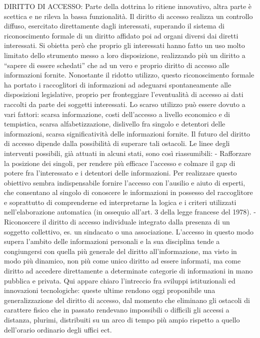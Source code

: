 DIRITTO DI ACCESSO:
Parte della dottrina lo ritiene innovativo, altra parte è scettica e ne rileva la bassa funzionalità.
Il diritto di accesso realizza un controllo diffuso, esercitato direttamente dagli interessati, superando il sistema di riconoscimento formale di un diritto affidato poi ad organi diversi dai diretti interessati. Si obietta però che proprio gli interessati hanno fatto un uso molto limitato dello strumento messo a loro disposizione, realizzando più un diritto a “sapere di essere schedati” che ad un vero e proprio diritto di accesso alle informazioni fornite. Nonostante il ridotto utilizzo, questo riconoscimento formale ha portato i raccoglitori di informazioni ad adeguarsi spontaneamente alle disposizioni legislative, proprio per fronteggiare l’eventualità di accesso ai dati raccolti da parte dei soggetti interessati. Lo scarso utilizzo può essere dovuto a vari fattori: scarsa informazione, costi dell’accesso a livello economico e di tempistica, scarsa alfabetizzazione, dislivello fra singolo e detentori delle informazioni, scarsa significatività delle informazioni fornite. Il futuro del diritto di accesso dipende dalla possibilità di superare tali ostacoli. Le linee degli interventi possibili, già attuati in alcuni stati, sono così riassumibili:
-	Rafforzare la posizione dei singoli, per rendere più efficace l’accesso e colmare il gap di potere fra l’interessato e i detentori delle informazioni. Per realizzare questo obiettivo sembra indispensabile fornire l’accesso con l’ausilio e aiuto di esperti, che consentano al singolo di conoscere le informazioni in possesso del raccoglitore e soprattutto di comprenderne ed interpretarne la logica e i criteri utilizzati nell’elaborazione automatica (in ossequio all’art. 3 della legge francese del 1978).
-	Riconoscere il diritto di accesso individuale integrato dalla presenza di un soggetto collettivo, es. un sindacato o una associazione. 
L’accesso in questo modo supera l’ambito delle informazioni personali e la sua disciplina tende a congiungersi con quella più generale del diritto all’informazione, ma visto in modo più dinamico, non più come unico diritto ad essere informati, ma come diritto ad accedere direttamente a determinate categorie di informazioni in mano pubblica e privata. Qui appare chiaro l’intreccio fra sviluppi istituzionali ed innovazioni tecnologiche: queste ultime rendono oggi proponibile una generalizzazione del diritto di accesso, dal momento che eliminano gli ostacoli di carattere fisico che in passato rendevano impossibili o difficili gli accessi a distanza, plurimi, distribuiti su un arco di tempo più ampio rispetto a quello dell’orario ordinario degli uffici ect.

